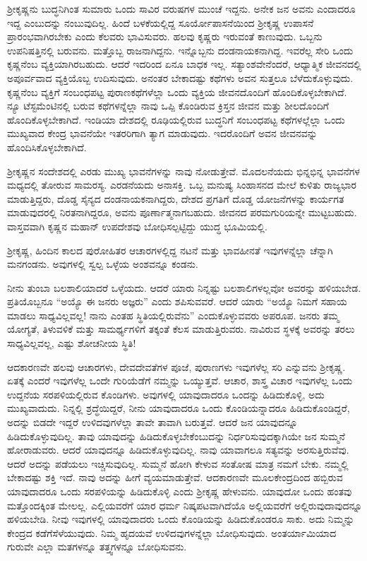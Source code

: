 ಶ‍್ರೀಕೃಷ್ಣನು ಬುದ್ಧನಿಗಿಂತ ಸುಮಾರು ಒಂದು ಸಾವಿರ ವರುಷಗಳ ಮುಂಚೆ ಇದ್ದನು. ಅನೇಕ ಜನ ಅವನು ಎಂದಾದರೂ ಇದ್ದ ಎಂಬುದನ್ನು ನಂಬುವುದಿಲ್ಲ. ಹಿಂದೆ ಬಳಕೆ\-ಯಲ್ಲಿದ್ದ ಸೂರ್ಯೋಪಾಸನೆಯಿಂದ ಶ‍್ರೀಕೃಷ್ಣ ಉಪಾಸನೆ ಪ್ರಾರಂಭವಾಗಿರಬೇಕು ಎಂದು ಕೆಲವರು ಭಾವಿಸುವರು. ಹಲವು ಕೃಷ್ಣರು ಇರುವಂತೆ ಕಾಣುವುದು. ಒಬ್ಬನು ಉಪನಿಷತ್ತಿನಲ್ಲಿ ಬರುವನು. ಮತ್ತೊಬ್ಬ ರಾಜನಾಗಿದ್ದನು. ಇನ್ನೊಬ್ಬನು ದಂಡನಾಯಕ\-ನಾಗಿದ್ದ. ಇವರೆಲ್ಲ ಸೇರಿ ಒಂದು ಕೃಷ್ಣನೆಂಬ ವ್ಯಕ್ತಿಯಾಗಿರಬಹುದು. ಆದರೆ ಇದರಿಂದ ಏನೂ ಬಾಧಕ ಇಲ್ಲ. ಸತ್ಯಾಂಶವೇನೆಂದರೆ, ಆಧ್ಯಾತ್ಮಿಕ ಜೀವನದಲ್ಲಿ ಅಪೂರ್ವವಾದ ವ್ಯಕ್ತಿಯೊಬ್ಬ ಉದಿಸುವುದು. ಅನಂತರ ಬೇಕಾದಷ್ಟು ಕಥೆಗಳು ಅವನ ಸುತ್ತಲೂ ಬೆಳೆದುಕೊಳ್ಳುವುದು. ಕೃಷ್ಣನೆಂಬ ವ್ಯಕ್ತಿಗೆ ಸಂಬಂಧಪಟ್ಟ ಪುರಾಣಕಥೆಗಳೆಲ್ಲಾ ಒಂದು ವ್ಯಕ್ತಿಯ ಜೀವನದೊಂದಿಗೆ ಹೊಂದಿಕೊಳ್ಳಬೇಕಾಗಿದೆ. ನ್ಯೂ ಟೆಸ್ಟಮೆಂಟಿನಲ್ಲಿ ಬರುವ ಕಥೆಗಳನ್ನೆಲ್ಲಾ ನಾವು ಒಪ್ಪಿ \-ಕೊಂಡಿರುವ ಕ್ರಿಸ್ತನ ಜೀವನ ಮತ್ತು ಶೀಲದೊಂದಿಗೆ ಹೊಂದಿಕೊಳ್ಳಬೇಕಾಗಿದೆ. ಇಂಡಿಯಾ ದೇಶದಲ್ಲಿ ರೂಢಿಯಲ್ಲಿರುವ ಬುದ್ಧನಿಗೆ ಸಂಬಂಧಪಟ್ಟ ಕಥೆಗಳಲ್ಲೆಲ್ಲಾ ಒಂದು ಮುಖ್ಯವಾದ ಕೇಂದ್ರ ಭಾವನೆಯೇ ಇತರರಿಗಾಗಿ ತ್ಯಾಗ ಮಾಡುವುದು. ಇದರೊಂದಿಗೆ ಅವನ ಜೀವನವನ್ನು ಹೊಂದಿಸಿಕೊಳ್ಳಬೇಕಾಗಿದೆ.

ಶ‍್ರೀಕೃಷ್ಣನ ಸಂದೇಶದಲ್ಲಿ ಎರಡು ಮುಖ್ಯ ಭಾವನೆಗಳನ್ನು ನಾವು ನೋಡುತ್ತೇವೆ. ಮೊದಲನೆಯದು ಭಿನ್ನಭಿನ್ನ ಭಾವನೆಗಳ ಮಧ್ಯದಲ್ಲಿ ತೋರುವ ಸಾಮರಸ್ಯ. ಎರಡನೆಯದು ಅನಾಸಕ್ತಿ. ಒಬ್ಬ ಮನುಷ್ಯ ಸಿಂಹಾಸನದ ಮೇಲೆ ಕುಳಿತು ರಾಜ್ಯಭಾರ ಮಾಡುತ್ತಿದ್ದರು, ದೊಡ್ಡ ಸೈನ್ಯದ ದಂಡನಾಯಕನಾಗಿದ್ದರು, ದೇಶದ ಪ್ರಗತಿಗೆ ದೊಡ್ಡ ಯೋಜನೆಗಳನ್ನು ಕಾರ್ಯಗತ ಮಾಡುವುದರಲ್ಲಿ ನಿರತನಾಗಿದ್ದರೂ, ಅವನು ಪೂರ್ಣಾತ್ಮನಾಗಬಹುದು. ಜೀವನದ ಪರಮಗುರಿಯನ್ನೇ ಮುಟ್ಟಬಹುದು. ವಾಸ್ತವವಾಗಿ ಕೃಷ್ಣನ ಮಹಾನ್​ ಉಪದೇಶವು ಬೋಧಿಸಲ್ಪಟ್ಟಿದ್ದು ಯುದ್ಧ ಭೂಮಿಯಲ್ಲಿ.

ಶ‍್ರೀಕೃಷ್ಣ, ಹಿಂದಿನ ಕಾಲದ ಪುರೋಹಿತರ ಆಚಾರಗಳಲ್ಲಿದ್ದ ನಟನೆ ಮತ್ತು ಭಾವಹೀನತೆ ಇವುಗಳನ್ನೆಲ್ಲಾ ಚೆನ್ನಾಗಿ ಮನಗಂಡನು. ಅವುಗಳಲ್ಲಿ ಸ್ವಲ್ಪ ಒಳ್ಳೆಯ ಅಂಶವನ್ನೂ ಕಂಡನು.

ನೀನು ತುಂಬಾ ಬಲಶಾಲಿಯಾದರೆ ಒಳ್ಳೆಯದು. ಆದರೆ ಯಾರು ನಿನ್ನಷ್ಟು ಬಲಶಾಲಿಗಳಲ್ಲವೋ ಅವರನ್ನು ಹಳಿಯಬೇಡ. ಪ್ರತಿಯೊಬ್ಬನೂ “ಅಯ್ಯೊ ಈ ಜನರು ಅಜ್ಞರು” ಎಂದು ಶಪಿಸುವವರೆ. ಆದರೆ ಯಾರು “ಅಯ್ಯೊ ನಿಮಗೆ ಸಹಾಯ ಮಾಡಲು ಸಾಧ್ಯವಿಲ್ಲವಲ್ಲ! ನಾನು ಎಂತಹ ಸ್ಥಿತಿಯಲ್ಲಿರುವೆನು” ಎಂದುಕೊಳ್ಳುವವರು ಅಪರೂಪ. ಜನರು ತಮ್ಮ ಯೋಗ್ಯತೆ, ತಿಳುವಳಿಕೆ ಮತ್ತು ಸಾಮರ್ಥ್ಯಗಳಿಗೆ ತಕ್ಕಂತೆ ಕೆಲಸ ಮಾಡುತ್ತಿರುವರು. ನಾವಿರುವ ಸ್ಥಳಕ್ಕೆ ಅವರನ್ನು ತರಲು ಸಾಧ್ಯವಿಲ್ಲವಲ್ಲ, ಎಷ್ಟು ಶೋಚನೀಯ ಸ್ಥಿತಿ!

ಆದಕಾರಣವೇ ಹಲವು ಆಚಾರಗಳು, ದೇವದೇವತೆಗಳ ಪೂಜೆ, ಪುರಾಣಗಳು ಇವುಗಳೆಲ್ಲ ಸರಿ ಎನ್ನುವನು ಶ‍್ರೀಕೃಷ್ಣ. ಏತಕ್ಕೆ ಎಂದರೆ ಇವುಗಳೆಲ್ಲ ಒಂದೇ ಗುರಿಯೆಡೆಗೆ ನಮ್ಮನ್ನು ಒಯ್ಯುತ್ತವೆ. ಆಚಾರ, ಶಾಸ್ತ್ರ ವಿಚಾರ ಇವುಗಳೆಲ್ಲ ಒಂದು ಉದ್ದನೆಯ ಸರಪಳಿ\-ಯಲ್ಲಿರುವ ಕೊಂಡಿಗಳು. ಅವುಗಳಲ್ಲಿ ಯಾವುದಾದರೂ ಒಂದನ್ನು ಹಿಡಿದುಕೊಳ್ಳಿ, ಅದು ಮುಖ್ಯವಾದುದು. ನಿನ್ನಲ್ಲಿ ಶ್ರದ್ಧೆಯಿದ್ದರೆ, ನೀನು ಯಾವುದಾದರೂ ಒಂದು ಕೊಂಡಿಯ\-ನ್ನಾದರೂ ಹಿಡಿದುಕೊಂಡಿದ್ದರೆ, ಅದನ್ನು ಬಿಡದೇ ಇದ್ದರೆ ಉಳಿದವುಗಳೆಲ್ಲಾ ತಾವೇ ತಾವಾಗಿ ಬರುತ್ತವೆ. ಆದರೆ ಜನ ಯಾವುದನ್ನೂ ಹಿಡಿದುಕೊಳ್ಳುವುದಿಲ್ಲ. ತಾವು ಯಾವುದನ್ನು ಹಿಡಿದುಕೊಳ್ಳಬೇಕೆಂಬುದನ್ನು ನಿರ್ಧರಿಸುವುದಕ್ಕಾಗಿಯೇ ಜನ ಸುಮ್ಮನೆ ಹೋರಾಡುವರು. ಆದರೆ ಯಾವುದನ್ನೂ ಹಿಡಿದುಕೊಳ್ಳುವುದಿಲ್ಲ. ನಾವು ಯಾವಾಗಲೂ ಸತ್ಯವನ್ನು ಅರಸುತ್ತಿರುವೆವು. ಆದರೆ ಅದನ್ನು ಪಡೆಯಲು ಇಚ್ಚಿಸುವುದಿಲ್ಲ. ಸುಮ್ಮನೆ ಹೋಗಿ ಕೇಳುವ ಸಂತೋಷ ಮಾತ್ರ ನಮಗೆ ಬೇಕು. ನಮ್ಮಲ್ಲಿ ಬೇಕಾದಷ್ಟು ಶಕ್ತಿ ಇದೆ. ನಾವು ಅದನ್ನು ಹೀಗೆ ವ್ಯಯಮಾಡುತ್ತೇವೆ. ಆದಕಾರಣವೇ ಮೂಲಕೇಂದ್ರದಿಂದ ಹಬ್ಬಿರುವ ಯಾವುದಾದರೂ ಒಂದು ಸರಪಳಿಯನ್ನು ಹಿಡಿದುಕೊಳ್ಳಿ ಎಂದು ಶ‍್ರೀಕೃಷ್ಣ ಹೇಳುವನು. ಯಾವುದೋ ಒಂದು ಹಂತವು ಮತ್ತೊಂದಕ್ಕಿಂತ ಮೇಲಲ್ಲ. ಎಲ್ಲಿಯವರೆಗೆ ಯಾರ ಧರ್ಮ ನಿಷ್ಕಪಟವಾಗಿದೆಯೊ ಅಲ್ಲಿಯವರೆಗೆ ಅಲ್ಲಿರುವುದಾವುದನ್ನೂ ಹಳಿಯಬೇಡಿ. ನೀವು ಇವುಗಳಲ್ಲಿ ಯಾವುದಾದರು ಒಂದು ಕೊಂಡಿಯನ್ನು ಹಿಡಿದುಕೊಂಡರೂ ಸಾಕು. ಅದು ನಿಮ್ಮನ್ನು ಕೇಂದ್ರದ ಕಡೆಗೆ\break ಸೆಳೆಯುವುದು. ನಿಮ್ಮ ಹೃದಯವೆ ಉಳಿದವುಗಳನ್ನೆಲ್ಲಾ ಬೋಧಿಸುವುದು. ಅಂತರ್ಯಾಮಿಯಾದ ಗುರುವೇ ಎಲ್ಲಾ ಮತಗಳನ್ನೂ ತತ್ತ್ವಗಳನ್ನೂ ಬೋಧಿಸುವನು.

